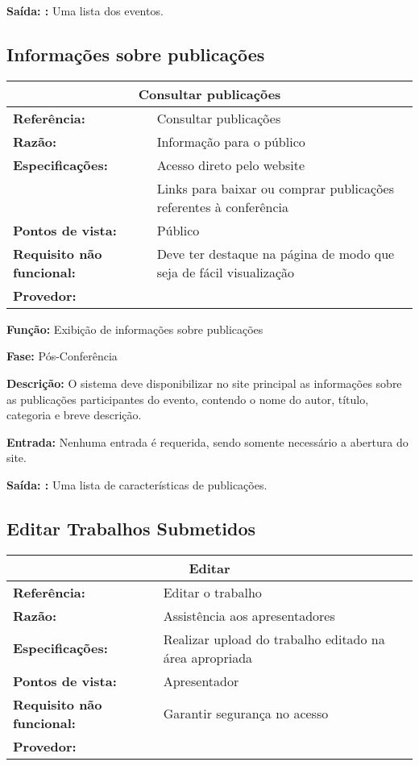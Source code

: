 \documentclass[letter]{article}
\begin{document}
\textbf{Saída: :} Uma lista dos eventos.


\newpage
\subsection{Informações sobre publicações}

%
\begin{table}[h!]\begin{center}
\begin{tabular}{|ll|}
\hline 
\multicolumn{2}{|c|}{\textbf{Consultar publicações}}\tabularnewline
\hline
\textbf{Referência:} & Consultar publicações\tabularnewline
\textbf{Razão:} & Informação para o público\tabularnewline
\textbf{Especificações:} & Acesso direto pelo website\tabularnewline
 & Links para baixar ou comprar publicações referentes à conferência\tabularnewline
\textbf{Pontos de vista:} & Público\tabularnewline
\textbf{Requisito não funcional:} & Deve ter destaque na página de modo que seja de fácil visualização\tabularnewline
\textbf{Provedor:} & \tabularnewline
\hline\end{tabular}\end{center}
\end{table}



\textbf{Função:} Exibição de informações sobre publicações

\textbf{Fase: } Pós-Conferência

\textbf{Descrição: } O sistema deve disponibilizar no site principal as informações sobre as publicações participantes do evento, contendo o nome do autor, título, categoria e breve descrição.

\textbf{Entrada: } Nenhuma entrada é requerida, sendo somente necessário a
abertura do site.

\textbf{Saída: :} Uma lista de características de publicações.



\subsection{Editar Trabalhos Submetidos}

%
\begin{table}[h!]
\begin{center}
\begin{tabular}{|ll|}
\hline 
\multicolumn{2}{|c|}{\textbf{Editar}}\tabularnewline
\hline
\textbf{Referência:} & Editar o trabalho\tabularnewline
\textbf{Razão:} & Assistência aos apresentadores\tabularnewline
\textbf{Especificações:} & Realizar upload do trabalho editado na área apropriada\tabularnewline
\textbf{Pontos de vista:} & Apresentador\tabularnewline
\textbf{Requisito não funcional:} & Garantir segurança no acesso\tabularnewline
\textbf{Provedor:} & \tabularnewline
\hline
\end{tabular}
\end{center}
\end{table}
\end{document}
